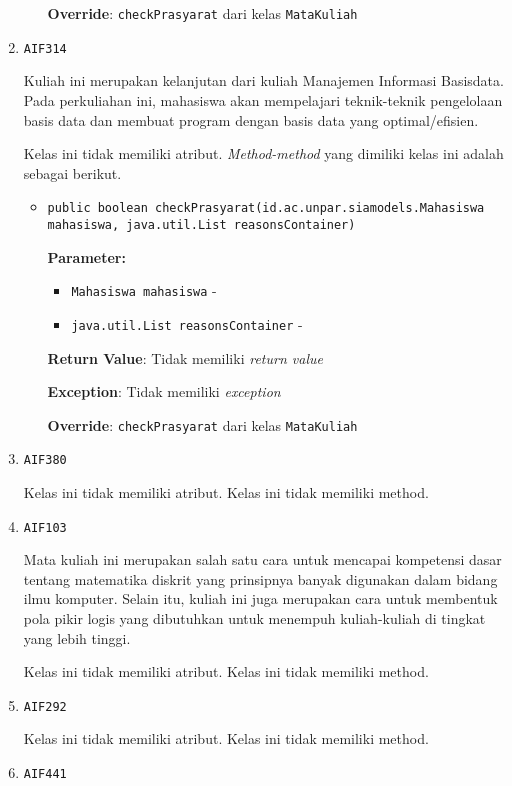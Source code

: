 \documentclass{article}
\begin{document}
\begin{enumerate}
\begin{itemize}
\textbf{Override}: \texttt{checkPrasyarat} dari kelas \texttt{MataKuliah}

\end{itemize}
\item \texttt{AIF314}

Kuliah ini merupakan kelanjutan dari kuliah Manajemen Informasi Basisdata.
 Pada perkuliahan ini, mahasiswa akan mempelajari teknik-teknik pengelolaan
 basis data dan membuat program dengan basis data yang optimal/efisien.

Kelas ini tidak memiliki atribut. \textit{Method-method} yang dimiliki kelas ini adalah sebagai berikut.
\begin{itemize}
\item \texttt{public boolean checkPrasyarat(id.ac.unpar.siamodels.Mahasiswa mahasiswa, java.util.List reasonsContainer)}

\textbf{Parameter:}
\begin{itemize}
\item \texttt{Mahasiswa mahasiswa} - 
\item \texttt{java.util.List reasonsContainer} - 
\end{itemize}
\textbf{Return Value}: Tidak memiliki \textit{return value}

\textbf{Exception}: Tidak memiliki \textit{exception}

\textbf{Override}: \texttt{checkPrasyarat} dari kelas \texttt{MataKuliah}

\end{itemize}
\item \texttt{AIF380}



Kelas ini tidak memiliki atribut. Kelas ini tidak memiliki method. \item \texttt{AIF103}

Mata kuliah ini merupakan salah satu cara untuk mencapai kompetensi dasar 
 tentang matematika diskrit yang prinsipnya banyak digunakan dalam bidang 
 ilmu komputer. Selain itu, kuliah ini juga merupakan cara untuk membentuk 
 pola pikir logis yang dibutuhkan untuk menempuh kuliah-kuliah di tingkat 
 yang lebih tinggi.

Kelas ini tidak memiliki atribut. Kelas ini tidak memiliki method. \item \texttt{AIF292}



Kelas ini tidak memiliki atribut. Kelas ini tidak memiliki method. \item \texttt{AIF441}


\end{enumerate}
\end{document}
